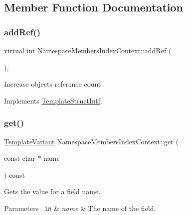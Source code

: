 \subsection{Member Function Documentation}
\mbox{\label{class_namespace_members_index_context_a48abb994ec8b22e257d71077f11bd75e}} 
\subsubsection{\texorpdfstring{addRef()}{addRef()}}
{\footnotesize\ttfamily virtual int Namespace\+Members\+Index\+Context\+::add\+Ref (\begin{DoxyParamCaption}{ }\end{DoxyParamCaption})\hspace{0.3cm}{\ttfamily [inline]}, {\ttfamily [virtual]}}

Increase object\textquotesingle{}s reference count 

Implements \mbox{\hyperlink{class_template_struct_intf_a05fe97ad47633beb326f69686faed581}{Template\+Struct\+Intf}}.

\mbox{\label{class_namespace_members_index_context_aad2cfedc7254b9cd95c51e9d82968151}} 
\subsubsection{\texorpdfstring{get()}{get()}}
{\footnotesize\ttfamily \mbox{\hyperlink{class_template_variant}{Template\+Variant}} Namespace\+Members\+Index\+Context\+::get (\begin{DoxyParamCaption}\item[{const char $\ast$}]{name }\end{DoxyParamCaption}) const\hspace{0.3cm}{\ttfamily [virtual]}}

Gets the value for a field name. 
\begin{DoxyParams}[1]{Parameters}
\mbox{\texttt{ in}}  & {\em name} & The name of the field. \\
\hline
\end{DoxyParams}


